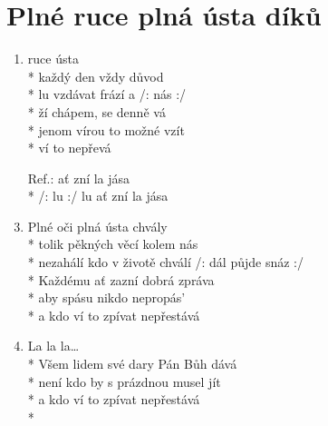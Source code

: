 \section{Plné ruce plná ústa díků}
\begin{enumerate}
\item {} ruce  ústa  \\*
každý den vždy  důvod  \\*
lu vzdávat  frází a  /:  nás  :/ \\*
ží chápem,  se denně vá \\*
jenom vírou  to možné vzít \\*
 ví to  nepřevá 
\item[Ref.:]     ať zní la jása \\*
/: lu :/     lu ať zní la jása  
\item Plné oči plná ústa chvály \\*
tolik pěkných věcí kolem nás \\*
nezahálí kdo v životě chválí /: dál půjde snáz :/ \\*
Každému ať zazní dobrá zpráva \\*
aby spásu nikdo nepropás' \\*
a kdo ví to zpívat nepřestává 
\item La la la… \\*
Všem lidem své dary Pán Bůh dává \\*
není kdo by s prázdnou musel jít \\*
a kdo ví to zpívat nepřestává \\*
\end{enumerate}
